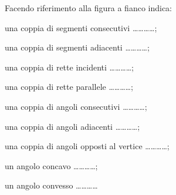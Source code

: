 \begin{esercizio}
\label{ese:1.59}
Facendo riferimento alla figura a fianco indica:

\begin{minipage}{.60\textwidth}
\begin{enumeratea}
\item una coppia di segmenti consecutivi \ldots\ldots\ldots\ldots{};
\item una coppia di segmenti adiacenti \ldots\ldots\ldots\ldots{};
\item una coppia di rette incidenti \ldots\ldots\ldots\ldots{};
\item una coppia di rette parallele \ldots\ldots\ldots\ldots{};
\item una coppia di angoli consecutivi \ldots\ldots\ldots\ldots{};
\item una coppia di angoli adiacenti \ldots\ldots\ldots\ldots{};
\item una coppia di angoli opposti al vertice 
\ldots\ldots\ldots\ldots{};
\item un angolo concavo \ldots\ldots\ldots\ldots{};
\item un angolo convesso \ldots\ldots\ldots\ldots{}
\end{enumeratea}
\end{minipage}
\hfill
\begin{minipage}{.34\textwidth}
\begin{inaccessibleblock}
 \centering
\end{inaccessibleblock}
\end{minipage}
\end{esercizio}

% 

